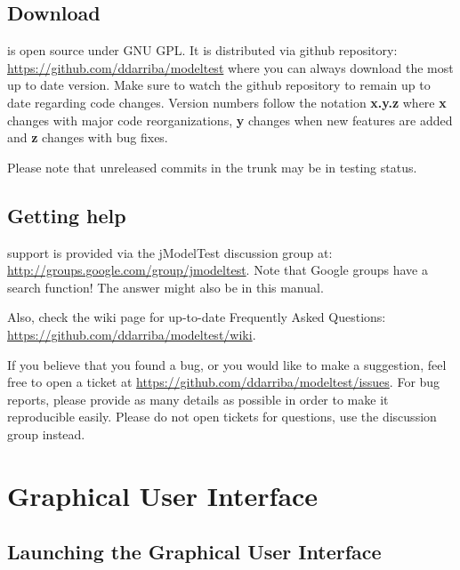 \documentclass[10pt,twoside,a4paper]{article}
\begin{document}
\subsection{Download}

\modeltest is open source under GNU GPL.
It is distributed via github repository:
\url{https://github.com/ddarriba/modeltest} where you can always download the most up to date version.
Make sure to watch the github repository to remain up to date regarding code changes.
Version numbers follow the notation {\bf x.y.z} where {\bf x} changes with major code reorganizations, {\bf y}
changes when new features are added and {\bf z} changes with bug fixes.

Please note that unreleased commits in the trunk may be in testing status.

\subsection{Getting help}

\modeltest support is provided via the jModelTest discussion group at: \url{http://groups.google.com/group/jmodeltest}.  Note that Google groups have a search function! The answer might also be in this manual.

Also, check the wiki page for up-to-date Frequently Asked Questions: \url{https://github.com/ddarriba/modeltest/wiki}.

If you believe that you found a bug, or you would like to make a suggestion, feel free to open a ticket at \url{https://github.com/ddarriba/modeltest/issues}.
For bug reports, please provide as many details as possible in order to make it reproducible easily.
Please do not open tickets for questions, use the discussion group instead.





\section{Graphical User Interface}
\label{sec:gui}

\subsection{Launching the Graphical User Interface}
\end{document}
